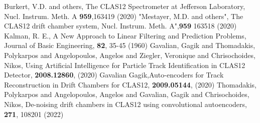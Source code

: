 \documentclass[preprint,12pt]{elsarticle}
\begin{document}
 \begin{thebibliography}{}
%
%
Burkert, V.D. and others, The CLAS12 Spectrometer at Jefferson Laboratory, Nucl. Instrum. Meth. A \textbf{959},163419 (2020)
 "Mestayer, M.D. and others", The CLAS12 drift chamber system, Nucl. Instrum. Meth. A",\textbf{959} 163518 (2020)
  Kalman, R. E., A New Approach to Linear Filtering and Prediction Problems, Journal of Basic Engineering, \textbf{82}, 35-45 (1960)
Gavalian, Gagik and Thomadakis, Polykarpos and Angelopoulos, Angelos and Ziegler, Veronique and Chrisochoides, Nikos, Using Artificial Intelligence for Particle Track Identification in CLAS12 Detector, \textbf{2008.12860}, (2020)
 Gavalian Gagik,Auto-encoders for Track Reconstruction in Drift Chambers for CLAS12, \textbf{2009.05144}, (2020)
   Thomadakis, Polykarpos and Angelopoulos, Angelos and Gavalian, Gagik and Chrisochoides, Nikos, De-noising drift chambers in CLAS12 using convolutional autoencoders, \textbf{271}, 108201 (2022)
\end{thebibliography}

%
%
\end{document}
